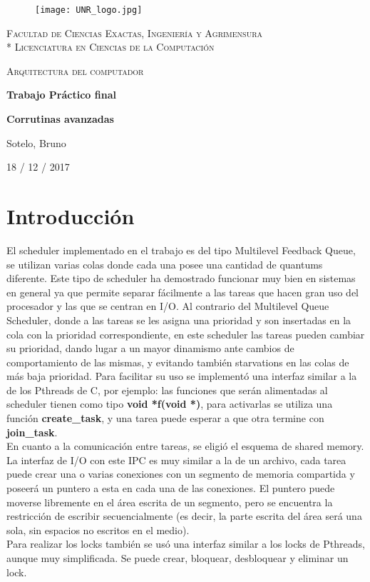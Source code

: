\documentclass[a4paper]{article}
\begin{document}
\raggedright

\begin{titlepage}
\centering
\begin{figure}[H]
    \begin{center}
        \texttt{[image: UNR\_logo.jpg]}
    \end{center}
\end{figure}
{\scshape\large Facultad de Ciencias Exactas, Ingenier\'ia y Agrimensura\\*
                 Licenciatura en Ciencias de la Computaci\'on\par}
\vspace{5cm}
{\scshape\LARGE Arquitectura del computador \par}
{\huge\bfseries Trabajo Pr\'actico final \par}
{\huge\bfseries Corrutinas avanzadas \par}
\vspace{3cm}
{\Large Sotelo, Bruno\par}
\vfill
{\large 18  / 12 / 2017 \par}
\end{titlepage}



\section{Introducción}
El scheduler implementado en el trabajo es del tipo Multilevel Feedback 
Queue, se utilizan varias colas donde cada una posee una cantidad de
quantums diferente. Este tipo de scheduler ha demostrado funcionar muy
bien en sistemas en general ya que permite separar fácilmente a las
tareas que hacen gran uso del procesador y las que se centran en I/O. Al
contrario del Multilevel Queue Scheduler, donde a las tareas se les
asigna una prioridad y son insertadas en la cola con la prioridad 
correspondiente, en este scheduler las tareas pueden cambiar su prioridad,
dando lugar a un mayor dinamismo ante cambios de comportamiento de las
mismas, y evitando también starvations en las colas de más baja prioridad.
Para facilitar su uso se implementó una interfaz similar a la de los
Pthreads de C, por ejemplo: las funciones que serán alimentadas al scheduler
tienen como tipo \textbf{void *f(void *)}, para activarlas se utiliza una
función \textbf{create\_task}, y una tarea puede esperar a que otra termine
con \textbf{join\_task}. \\
En cuanto a la comunicación entre tareas, se eligió el esquema de shared
memory. La interfaz de I/O con este IPC es muy similar a la de un archivo,
cada tarea puede crear una o varias conexiones con un segmento de memoria
compartida y poseerá un puntero a esta en cada una de las conexiones. El
puntero puede moverse libremente en el área escrita de un segmento, pero
se encuentra la restricción de escribir secuencialmente (es decir, la 
parte escrita del área será una sola, sin espacios no escritos en el
medio). \\
Para realizar los locks también se usó una interfaz similar a los locks
de Pthreads, aunque muy simplificada. Se puede crear, bloquear, desbloquear
y eliminar un lock.
\end{document}
